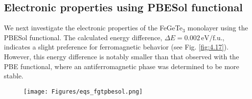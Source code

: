 \subsection{Electronic properties using PBESol functional}

We next investigate the electronic properties of the FeGeTe\(_3\) monolayer using the PBESol functional. The calculated energy difference, \(\Delta E = 0.002 \, \text{eV/f.u.}\), indicates a slight preference for ferromagnetic behavior (see Fig. \ref{fig:4.17}). However, this energy difference is notably smaller than that observed with the PBE functional, where an antiferromagnetic phase was determined to be more stable.

\begin{figure}[H]
	\begin{minipage}[b]{.45\linewidth}
		\centering
		\texttt{[image: Figures/eqs\_fgtpbesol.png]}
		\vspace{-5cm}
	\end{minipage}\hfill
	\begin{minipage}[b]{.55\linewidth}
		\centering
\end{minipage}
\end{figure}
